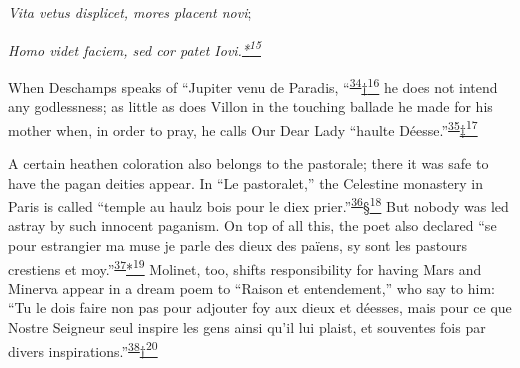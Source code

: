 \emph{Vita vetus displicet, mores placent novi};

\emph{Homo videt faciem, sed cor patet
Iovi.\protect\hypertarget{22_Chapter_Fourteen__THE_COMING_OF.xhtmlux5cux23id_2783}{\protect\hyperlink{23_NOTES.xhtmlux5cux23id_2784}{*\textsuperscript{15}}}}

When Deschamps speaks of ``Jupiter venu de Paradis,
``\textsuperscript{\protect\hypertarget{22_Chapter_Fourteen__THE_COMING_OF.xhtmlux5cux23id_57}{\protect\hyperlink{23_NOTES.xhtmlux5cux23id_58}{34}}}\protect\hypertarget{22_Chapter_Fourteen__THE_COMING_OF.xhtmlux5cux23id_2781}{\protect\hyperlink{23_NOTES.xhtmlux5cux23id_2782}{†\textsuperscript{16}}}
he does not intend any godlessness; as little as does Villon in the
touching ballade he made for his mother when, in order to pray, he calls
Our Dear Lady ``haulte
Déesse.''\textsuperscript{\protect\hypertarget{22_Chapter_Fourteen__THE_COMING_OF.xhtmlux5cux23id_55}{\protect\hyperlink{23_NOTES.xhtmlux5cux23id_56}{35}}}\protect\hypertarget{22_Chapter_Fourteen__THE_COMING_OF.xhtmlux5cux23id_2779}{\protect\hyperlink{23_NOTES.xhtmlux5cux23id_2780}{‡\textsuperscript{17}}}

A certain heathen coloration also belongs to the pastorale; there it was
safe to have the pagan deities appear. In ``Le pastoralet,'' the
Celestine monastery in Paris is called ``temple au haulz bois pour le
diex
prier.''\textsuperscript{\protect\hypertarget{22_Chapter_Fourteen__THE_COMING_OF.xhtmlux5cux23id_53}{\protect\hyperlink{23_NOTES.xhtmlux5cux23id_54}{36}}}\protect\hypertarget{22_Chapter_Fourteen__THE_COMING_OF.xhtmlux5cux23id_2777}{\protect\hyperlink{23_NOTES.xhtmlux5cux23id_2778}{§\textsuperscript{18}}}
But nobody was led astray by such innocent
pa\protect\hypertarget{22_Chapter_Fourteen__THE_COMING_OF.xhtmlux5cux23page_394}{}{}ganism.
On top of all this, the poet also declared ``se pour estrangier ma muse
je parle des dieux des païens, sy sont les pastours crestiens et
moy.''\textsuperscript{\protect\hypertarget{22_Chapter_Fourteen__THE_COMING_OF.xhtmlux5cux23id_51}{\protect\hyperlink{23_NOTES.xhtmlux5cux23id_52}{37}}}\protect\hypertarget{22_Chapter_Fourteen__THE_COMING_OF.xhtmlux5cux23id_2775}{\protect\hyperlink{23_NOTES.xhtmlux5cux23id_2776}{*\textsuperscript{19}}}
Molinet, too, shifts responsibility for having Mars and Minerva appear
in a dream poem to ``Raison et entendement,'' who say to him: ``Tu le
dois faire non pas pour adjouter foy aux dieux et déesses, mais pour ce
que Nostre Seigneur seul inspire les gens ainsi qu'il lui plaist, et
souventes fois par divers
inspirations.''\textsuperscript{\protect\hypertarget{22_Chapter_Fourteen__THE_COMING_OF.xhtmlux5cux23id_49}{\protect\hyperlink{23_NOTES.xhtmlux5cux23id_50}{38}}}\protect\hypertarget{22_Chapter_Fourteen__THE_COMING_OF.xhtmlux5cux23id_2773}{\protect\hyperlink{23_NOTES.xhtmlux5cux23id_2774}{†\textsuperscript{20}}}

